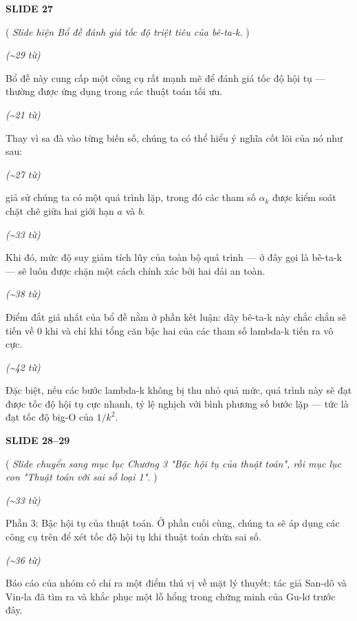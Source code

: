 ﻿\documentclass[12pt]{article}
\newcommand{\scene}[1]{
    \vspace{18pt}
    \normalsize
    \noindent\textbf{\MakeUppercase{#1}}
    \vspace{12pt}
}
\newcommand{\action}[1]{
    \vspace{6pt}
    \small
    \noindent(\textit{#1})
    \vspace{6pt}
}
\newenvironment{speech}{
    \normalsize
    \begin{list}{}{
        \leftmargin=1.25in
        \rightmargin=1.25in
        \parsep=0pt
        \topsep=0pt
        \partopsep=0pt
    }
    \item[]
}{
    \end{list}
    \vspace{6pt}
}
\newcommand{\block}[1]{
    \vspace{4pt}
    \noindent\hspace{1.5in}\textit{(\textasciitilde #1 từ)}
}
\begin{document}
\scene{SLIDE 27}

\action{
    Slide hiện Bổ đề đánh giá tốc độ triệt tiêu của bê-ta-k.
}

\block{29}
\begin{speech}
    Bổ đề này cung cấp một công cụ rất mạnh mẽ để đánh giá tốc độ hội tụ — thường được ứng dụng trong các thuật toán tối ưu.
\end{speech}

\block{21}
\begin{speech}
    Thay vì sa đà vào từng biến số, chúng ta có thể hiểu ý nghĩa cốt lõi của nó như sau:
\end{speech}

\block{27}
\begin{speech}
    giả sử chúng ta có một quá trình lặp, trong đó các tham số $\alpha_k$ được kiểm soát chặt chẽ giữa hai giới hạn $a$ và $b$.
\end{speech}

\block{33}
\begin{speech}
    Khi đó, mức độ suy giảm tích lũy của toàn bộ quá trình — ở đây gọi là bê-ta-k — sẽ luôn được chặn một cách chính xác bởi hai dải an toàn.
\end{speech}

\block{38}
\begin{speech}
    Điểm đắt giá nhất của bổ đề nằm ở phần kết luận: dãy bê-ta-k này chắc chắn sẽ tiến về $0$ khi và chỉ khi tổng căn bậc hai của các tham số lambda-k tiến ra vô cực.
\end{speech}

\block{42}
\begin{speech}
    Đặc biệt, nếu các bước lambda-k không bị thu nhỏ quá mức, quá trình này sẽ đạt được tốc độ hội tụ cực nhanh, tỷ lệ nghịch với bình phương số bước lặp — tức là đạt tốc độ big-O của $1/k^2$.
\end{speech}

\scene{SLIDE 28--29}

\action{
    Slide chuyển sang mục lục Chương 3 "Bậc hội tụ của thuật toán", rồi mục lục con "Thuật toán với sai số loại 1".
}

\block{33}
\begin{speech}
    Phần 3: Bậc hội tụ của thuật toán. Ở phần cuối cùng, chúng ta sẽ áp dụng các công cụ trên để xét tốc độ hội tụ khi thuật toán chứa sai số.
\end{speech}

\block{36}
\begin{speech}
    Báo cáo của nhóm có chỉ ra một điểm thú vị về mặt lý thuyết: tác giả San-dô và Vin-la đã tìm ra và khắc phục một lỗ hổng trong chứng minh của Gu-lơ trước đây.
\end{speech}
\end{document}
